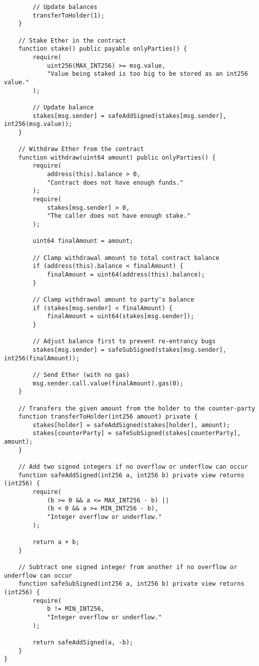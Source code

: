 \begin{lstlisting}
        // Update balances
        transferToHolder(1);
    }

    // Stake Ether in the contract
    function stake() public payable onlyParties() {
        require(
            uint256(MAX_INT256) >= msg.value,
            "Value being staked is too big to be stored as an int256 value."
        );

        // Update balance
        stakes[msg.sender] = safeAddSigned(stakes[msg.sender], int256(msg.value));
    }

    // Withdraw Ether from the contract
    function withdraw(uint64 amount) public onlyParties() {
        require(
            address(this).balance > 0,
            "Contract does not have enough funds."
        );
        require(
            stakes[msg.sender] > 0,
            "The caller does not have enough stake."
        );

        uint64 finalAmount = amount;

        // Clamp withdrawal amount to total contract balance
        if (address(this).balance < finalAmount) {
            finalAmount = uint64(address(this).balance);
        }

        // Clamp withdrawal amount to party's balance
        if (stakes[msg.sender] < finalAmount) {
            finalAmount = uint64(stakes[msg.sender]);
        }

        // Adjust balance first to prevent re-entrancy bugs
        stakes[msg.sender] = safeSubSigned(stakes[msg.sender], int256(finalAmount));

        // Send Ether (with no gas)
        msg.sender.call.value(finalAmount).gas(0);
    }

    // Transfers the given amount from the holder to the counter-party
    function transferToHolder(int256 amount) private {
        stakes[holder] = safeAddSigned(stakes[holder], amount);
        stakes[counterParty] = safeSubSigned(stakes[counterParty], amount);
    }

    // Add two signed integers if no overflow or underflow can occur
    function safeAddSigned(int256 a, int256 b) private view returns (int256) {
        require(
            (b >= 0 && a <= MAX_INT256 - b) ||
            (b < 0 && a >= MIN_INT256 - b),
            "Integer overflow or underflow."
        );

        return a + b;
    }

    // Subtract one signed integer from another if no overflow or underflow can occur
    function safeSubSigned(int256 a, int256 b) private view returns (int256) {
        require(
            b != MIN_INT256,
            "Integer overflow or underflow."
        );

        return safeAddSigned(a, -b);
    }
}
\end{lstlisting}